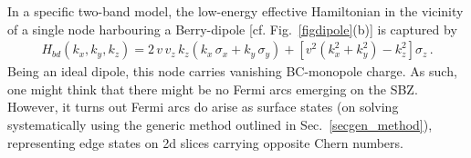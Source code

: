 \documentclass[aps,prb,onecolumn, footinbib, 10pt]{revtex4-2}
\begin{document}
In a specific two-band model, the low-energy effective Hamiltonian in the vicinity of a single node harbouring a Berry-dipole [cf. Fig.~\ref{figdipole}(b)] is captured by \cite{twoband-dipole}
\begin{align}
\label{eqbcd1}
H_{bd} (k_x, k_y, k_z)= 2\, v\, v_z \, k_z \left( k_x \, \sigma_x  +  k_y \,\sigma_y  \right )
+  \left [ v^2 \left( k_x^2 +k_y^2 \right) - k_z^2 \right ] \sigma_z \,.
\end{align}
Being an ideal dipole, this node carries vanishing BC-monopole charge. As such, one might think that there might be no Fermi arcs emerging on the SBZ. However, it turns out Fermi arcs do arise as surface states (on solving systematically using the generic method outlined in Sec.~\ref{secgen_method}), representing edge states on 2d slices carrying opposite Chern numbers. 
\end{document}
